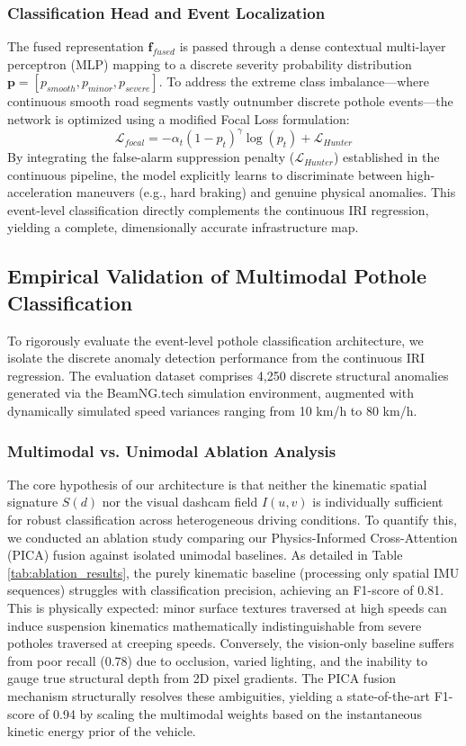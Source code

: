 \documentclass[conference]{IEEEtran}
\begin{document}
\subsubsection{Classification Head and Event Localization}
The fused representation $\mathbf{f}_{fused}$ is passed through a dense contextual multi-layer perceptron (MLP) mapping to a discrete severity probability distribution $\mathbf{p} 
= [p_{smooth}, p_{minor}, p_{severe}]$. To address the extreme class imbalance---where continuous smooth road segments vastly outnumber discrete pothole events---the network is optimized using a modified Focal Loss formulation:
\begin{equation}
    \mathcal{L}_{focal} = -\alpha_t (1 - p_{t})^\gamma \log(p_t) + \mathcal{L}_{Hunter}
\end{equation}
By integrating the false-alarm suppression penalty ($\mathcal{L}_{Hunter}$) established in the continuous pipeline, the model explicitly learns to discriminate between high-acceleration maneuvers (e.g., hard braking) and genuine physical anomalies.
This event-level classification directly complements the continuous IRI regression, yielding a complete, dimensionally accurate infrastructure map.

\subsection{Empirical Validation of Multimodal Pothole Classification}
\label{sec:classification_results}

To rigorously evaluate the event-level pothole classification architecture, we isolate the discrete anomaly detection performance from the continuous IRI regression.
The evaluation dataset comprises 4,250 discrete structural anomalies generated via the BeamNG.tech simulation environment, augmented with dynamically simulated speed variances ranging from 10 km/h to 80 km/h.

\subsubsection{Multimodal vs. Unimodal Ablation Analysis}
The core hypothesis of our architecture is that neither the kinematic spatial signature $S(d)$ nor the visual dashcam field $I(u,v)$ is individually sufficient for robust classification across heterogeneous driving conditions.
To quantify this, we conducted an ablation study comparing our Physics-Informed Cross-Attention (PICA) fusion against isolated unimodal baselines.
As detailed in Table \ref{tab:ablation_results}, the purely kinematic baseline (processing only spatial IMU sequences) struggles with classification precision, achieving an F1-score of 0.81.
This is physically expected: minor surface textures traversed at high speeds can induce suspension kinematics mathematically indistinguishable from severe potholes traversed at creeping speeds.
Conversely, the vision-only baseline suffers from poor recall (0.78) due to occlusion, varied lighting, and the inability to gauge true structural depth from 2D pixel gradients.
The PICA fusion mechanism structurally resolves these ambiguities, yielding a state-of-the-art F1-score of 0.94 by scaling the multimodal weights based on the instantaneous kinetic energy prior of the vehicle.
\end{document}
